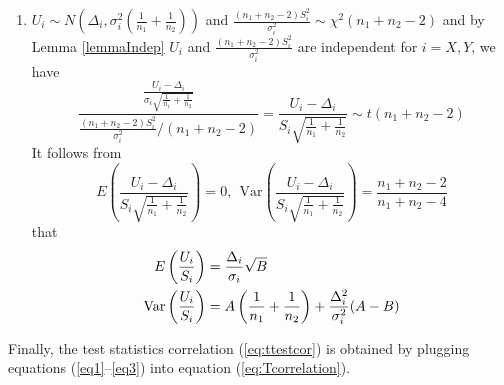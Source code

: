 \begin{enumerate}
	\item $U_i\sim N\left(\Delta_i, \sigma_i^2(\frac{1}{n_1} + \frac{1}{n_2})\right)$ and 
	$\frac{(n_1 + n_2 -2)S_i^2}{\sigma_i^2} \sim
	\chi^2(n_1 + n_2-2)$ and by Lemma \ref{lemmaIndep}  $U_i$ and $\frac{(n_1 + n_2 
		-2)S_i^2}{\sigma_i^2}$ are independent for $i = X, Y$, we have 
	\begin{equation}
	\frac{\frac{U_i-\Delta_i}{\sigma_i\sqrt{\frac{1}{n_1} + \frac{1}{n_2}}}}{\frac{(n_1 + 
			n_2-2)S_i^2}{\sigma_i^2}/(n_1 + n_2 -2)}  =
	\frac{U_i-\Delta_i}{S_i\sqrt{\frac{1}{n_1 } + \frac{1}{n_2}}}\sim t(n_1 + n_2-2)
	\end{equation}	
	It follows from 
	\begin{equation}
	E\left(\frac{U_i-\Delta_i}{S_i\sqrt{\frac{1}{n_1} + \frac{1}{n_2}}}\right)=0, ~~ 
	\text{Var}\left(\frac{U_i-\Delta_i}{S_i\sqrt{\frac{1}{n_1} + \frac{1}{n_2}}}\right) = 
	\frac{n_1 + n_2-2}{n_1 + n_2-4}
	\end{equation}
	that
	\begin{equation}\label{eq3}
	\begin{aligned}
	E\left(\frac{U_i}{S_i}\right) &= \frac{\Delta_i}{\sigma_i}\sqrt{B} \\
	\text{Var}\left(\frac{U_i}{S_i}\right)&=A\left(\frac{1}{n_1} + \frac{1}{n_2}\right) + 
	\frac{\Delta_i^2}{\sigma_i^2}(A-B)
	\end{aligned}
	\end{equation}
\end{enumerate}
Finally,  the test statistics correlation (\ref{eq:ttestcor}) is obtained by plugging
equations (\ref{eq1}--\ref{eq3}) into equation (\ref{eq:Tcorrelation}).

